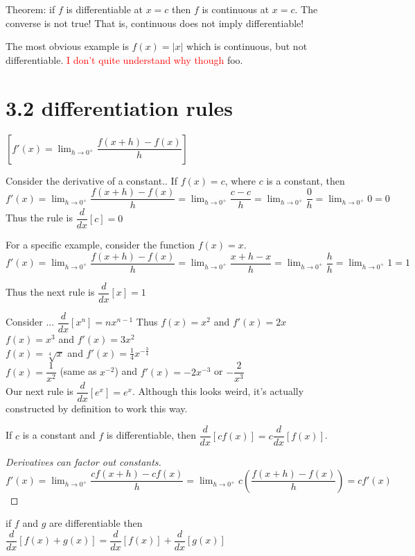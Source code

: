 \documentclass[12pt]{article}
\begin{document}
Theorem: if $f$ is differentiable at $x=c$ then $f$ is continuous at $x=c$. The converse is not true! That
is, continuous does not imply differentiable!

The most obvious example is $f(x) = |x|$ which is continuous, but not differentiable. 
\textcolor{red}{I don't quite understand why though } foo.
\section{3.2 differentiation rules}
$ \left[ f'(x) = \lim_{h\to0^{+}}\dfrac{f(x+h)-f(x)}{h} \right] $

Consider the derivative of a constant..
If $f(x)=c$, where $c$ is a constant, then $f'(x) = \lim_{h\to0^{+}}\dfrac{f(x+h)-f(x)}{h} =
\lim_{h\to0^{+}}\dfrac{c-c}{h}=\lim_{h\to0^{+}}\dfrac{0}{h}=\lim_{h\to0^{+}}0=0$
Thus the rule is $\dfrac{d}{dx} \left[ c \right] = 0$

For a specific example, consider the function $f(x)=x$.
 $f'(x) = \lim_{h\to0^{+}}\dfrac{f(x+h)-f(x)}{h} =
\lim_{h\to0^{+}}\dfrac{x+h-x}{h}=\lim_{h\to0^{+}}\dfrac{h}{h}=\lim_{h\to0^{+}}1=1$

Thus the next rule is  $\dfrac{d}{dx} \left[ x \right] = 1$

Consider  ...  $\dfrac{d}{dx} \left[ x^{n} \right] = nx^{n-1}$
Thus $f(x)=x^{2}$ and $f'(x)=2x$\\
$f(x)=x^{3}$ and $f'(x)=3x^{2}$\\
$f(x)=\sqrt[4]{x}$ and $f'(x)=\frac{1}{4}x^{-\frac{3}{4}}$\\
$f(x)=\dfrac{1}{x^{2}}$ (same as $x^{-2}$) and $f'(x)=-2x^{-3}$ or $-\dfrac{2}{x^{3}}$\\

Our next rule is   $\dfrac{d}{dx} \left[ e^{x} \right] = e^{x}$. Although this looks weird, it's actually
constructed by definition to work this way.

If $c$ is a constant and $f$ is differentiable, then $\dfrac{d}{dx} \left[ cf(x) \right] = c\dfrac{d}{dx} \left[ f(x) \right]$.

\begin{proof}[Derivatives can factor out constants]
  $f'(x) = \lim_{h\to0^{+}}\dfrac{cf(x+h)-cf(x)}{h} = \lim_{h\to0^{+}}c \left(\dfrac{f(x+h)-f(x)}{h} \right) = cf'(x)$
\end{proof}

if $f$ and $g$ are differentiable then $\dfrac{d}{dx} \left[ f(x)+g(x) \right] =  \dfrac{d}{dx} \left[ f(x)
\right] + \dfrac{d}{dx} \left[ g(x) \right]$
\end{document}
